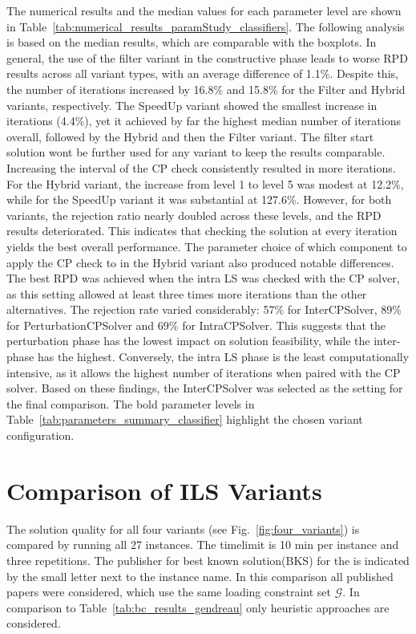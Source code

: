 The numerical results and the median values for each parameter level are shown in Table~\ref{tab:numerical_results_paramStudy_classifiers}.
The following analysis is based on the median results, which are comparable with the boxplots.
In general, the use of the filter variant in the constructive phase leads to worse RPD results across all variant types,
with an average difference of 1.1\%. Despite this, the number of iterations increased by 16.8\% and 15.8\% for the Filter and Hybrid variants,
respectively. The SpeedUp variant showed the smallest increase in iterations (4.4\%), yet it achieved by far the highest median
number of iterations overall, followed by the Hybrid and then the Filter variant. The filter start solution wont be further used for any variant to
keep the results comparable. Increasing the interval of the \gls{CP} check consistently resulted in more iterations. For the Hybrid variant,
the increase from level 1 to level 5 was modest at 12.2\%, while for the SpeedUp variant it was substantial at 127.6\%. However, for both
variants, the rejection ratio nearly doubled across these levels, and the RPD results deteriorated. This indicates that checking the solution
at every iteration yields the best overall performance. The parameter choice of which component to apply the \gls{CP} check to in the Hybrid variant also produced notable differences.
The best RPD was achieved when the intra \gls{LS} was checked with the \gls{CP} solver, as this setting allowed at least three times more
iterations than the other alternatives. The rejection rate varied considerably: 57\% for InterCPSolver, 89\% for PerturbationCPSolver
and 69\% for IntraCPSolver. This suggests that the perturbation phase has the lowest impact on solution feasibility, while the inter-phase
has the highest. Conversely, the intra \gls{LS} phase is the least computationally intensive, as it allows the highest number of iterations
when paired with the \gls{CP} solver. Based on these findings, the InterCPSolver was selected as the setting for the final comparison.
The bold parameter levels in Table~\ref{tab:parameters_summary_classifier} highlight the chosen variant configuration.

\section{Comparison of ILS Variants}
\label{sec:comparison_ils_variants}

The solution quality for all four variants (see Fig.~\ref{fig:four_variants}) is compared by running all 27 instances.
The timelimit is 10 min per instance and three repetitions.
The publisher for best known solution(BKS) for the \gendreauDataSetText is indicated by the small letter
next to the instance name. In this comparison all published papers were considered, which use the same loading constraint set $\mathcal{G}$.
In comparison to Table~\ref{tab:bc_results_gendreau} only heuristic approaches are considered.


